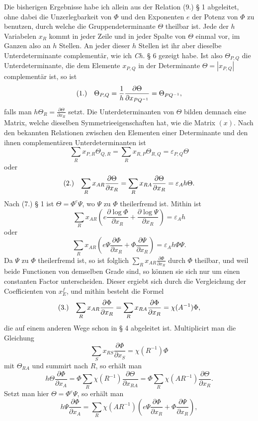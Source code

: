 \documentclass[11pt]{article}
\makeatletter
\newcommand{\frobtagc}[2]{\[\begin{array}{@{}r@{\quad}c@{}}\textup{(#1)} & \displaystyle #2\end{array}\]}
\makeatother
\begin{document}
Die bisherigen Ergebnisse habe ich allein aus der Relation (9.) § 1 abgeleitet, ohne dabei die Unzerlegbarkeit von $\Phi$ und den Exponenten $e$ der Potenz von $\Phi$ zu benutzen, durch welche die Gruppendeterminante $\Theta$ theilbar ist. Jede der $h$ Variabelen $x_R$ kommt in jeder Zeile und in jeder Spalte von $\Theta$ einmal vor, im Ganzen also an $h$ Stellen. An jeder dieser $h$ Stellen ist ihr aber dieselbe Unterdeterminante complementär, wie ich \emph{Ch.} § 6 gezeigt habe. Ist also $\Theta_{P,Q}$ die Unterdeterminante, die dem Elemente $x_{P,Q}$ in der Determinante $\Theta=|x_{P,Q}|$ complementär ist, so ist
\frobtagc{1.}{\Theta_{P,Q}=\frac{1}{h}\frac{\partial\Theta}{\partial x_{PQ^{-1}}}=\Theta_{PQ^{-1}},}
falls man $h\Theta_R=\frac{\partial\Theta}{\partial x_R}$ setzt. Die Unterdeterminanten von $\Theta$ bilden demnach eine Matrix, welche dieselben Symmetrieeigenschaften hat, wie die Matrix $(x)$. Nach den bekannten Relationen zwischen den Elementen einer Determinante und den ihnen complementären Unterdeterminanten ist
\[
\sum_R x_{P,R}\Theta_{Q,R}=\sum_R x_{R,P}\Theta_{R,Q}=\varepsilon_{P,Q}\Theta
\]
oder
\frobtagc{2.}{\sum_R x_{AR}\frac{\partial\Theta}{\partial x_R}=\sum_R x_{RA}\frac{\partial\Theta}{\partial x_R}=\varepsilon_A h\Theta.}
Nach (7.) § 1 ist $\Theta=\Phi^e\Psi$, wo $\Psi$ zu $\Phi$ theilerfremd ist. Mithin ist
\[
\sum_R x_{AR}\left(e\frac{\partial\log\Phi}{\partial x_R}+\frac{\partial\log\Psi}{\partial x_R}\right)=\varepsilon_A h
\]
oder
\[
\sum_R x_{AR}\left(e\Psi\frac{\partial\Phi}{\partial x_R}+\Phi\frac{\partial\Psi}{\partial x_R}\right)=\varepsilon_A h\Phi\Psi.
\]
Da $\Psi$ zu $\Phi$ theilerfremd ist, so ist folglich $\sum_Rx_{AR}\frac{\partial\Phi}{\partial x_R}$ durch $\Phi$ theilbar, und weil beide Functionen von demselben Grade sind, so können sie sich nur um einen constanten Factor unterscheiden. Dieser ergiebt sich durch die Vergleichung der Coefficienten von $x_E^f$, und mithin besteht die Formel
\frobtagc{3.}{\sum_R x_{AR}\frac{\partial\Phi}{\partial x_R}=\sum_R x_{RA}\frac{\partial\Phi}{\partial x_R}=\chi(A^{-1})\Phi,}
die auf einem anderen Wege schon in § 4 abgeleitet ist. Multiplicirt man die Gleichung
\[
\sum_S x_{RS}\frac{\partial\Phi}{\partial x_S}=\chi(R^{-1})\Phi
\]
mit $\Theta_{RA}$ und summirt nach $R$, so erhält man
\[
h\Theta\frac{\partial\Phi}{\partial x_A}=\Phi\sum_R\chi(R^{-1})\frac{\partial\Theta}{\partial x_{RA}}=\Phi\sum_R\chi(AR^{-1})\frac{\partial\Theta}{\partial x_R}.
\]
Setzt man hier $\Theta=\Phi^e\Psi$, so erhält man
\[
h\Psi\frac{\partial\Phi}{\partial x_A}=\sum_R\chi(AR^{-1})\left(e\Psi\frac{\partial\Phi}{\partial x_R}+\Phi\frac{\partial\Psi}{\partial x_R}\right),
\]
\end{document}
